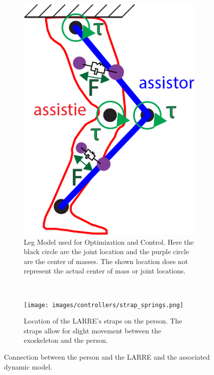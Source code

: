 \begin{figure}
    \centering
    \begin{subfigure}{0.5\textwidth}
        \centering
        \includegraphics[width=0.75\linewidth]{images/controllers/leg.png}
        \captionsetup{width=.8\linewidth}%
        \caption[Leg Model used for Optimization and Control]{Leg Model used for Optimization and Control. Here the black circle are the joint  location and the purple circle are the center of masses. The shown location does not represent the actual center of mass or joint locations.}
        \label{fig:LegModel}
    \end{subfigure}%
    ~
        \begin{subfigure}{0.5\textwidth}
        \centering
        \texttt{[image: images/controllers/strap\_springs.png]}
        \captionsetup{width=.8\linewidth}%
        \caption[LARRE with strap positions]{Location of the LARRE's straps on the person. The straps allow for slight movement between the exoskeleton and the person.}
        \label{fig:strappositions}
    \end{subfigure}
    \caption[Connection between LARRE and the person]{Connection between the person and the LARRE and the associated dynamic model.}
    \label{fig:my_label}
\end{figure}




